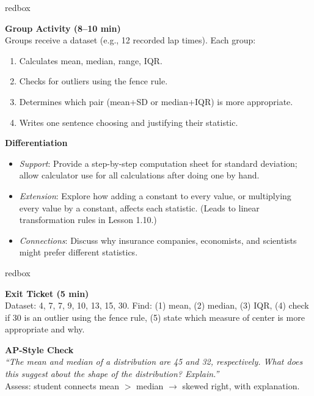 \documentclass[10pt]{article}
\begin{document}
\begin{skillbox}{redbox}
\begin{minipage}[t]{0.48\linewidth}
    \textbf{Group Activity (8--10 min)}\\
    Groups receive a dataset (e.g., 12 recorded lap times). Each group:
    \begin{enumerate}
        \item Calculates mean, median, range, IQR.
        \item Checks for outliers using the fence rule.
        \item Determines which pair (mean+SD or median+IQR) is more appropriate.
        \item Writes one sentence choosing and justifying their statistic.
    \end{enumerate}
\end{minipage}
\hfill
\begin{minipage}[t]{0.48\linewidth}
    \textbf{Differentiation}
    \begin{itemize}
        \item \textit{Support}: Provide a step-by-step computation sheet for standard deviation; allow calculator use for all calculations after doing one by hand.
        \item \textit{Extension}: Explore how adding a constant to every value, or multiplying every value by a constant, affects each statistic. (Leads to linear transformation rules in Lesson 1.10.)
        \item \textit{Connections}: Discuss why insurance companies, economists, and scientists might prefer different statistics.
    \end{itemize}
\end{minipage}
\end{skillbox}

\begin{skillbox}{redbox}
\begin{minipage}[t]{0.48\linewidth}
    \textbf{Exit Ticket (5 min)}\\
    Dataset: 4, 7, 7, 9, 10, 13, 15, 30. Find: (1) mean, (2) median, (3) IQR, (4) check if 30 is an outlier using the fence rule, (5) state which measure of center is more appropriate and why.
\end{minipage}
\hfill
\begin{minipage}[t]{0.48\linewidth}
    \textbf{AP-Style Check}\\
    \textit{``The mean and median of a distribution are 45 and 32, respectively. What does this suggest about the shape of the distribution? Explain.''}\\[4pt]
    Assess: student connects mean $>$ median $\to$ skewed right, with explanation.
\end{minipage}
\end{skillbox}
\end{document}
